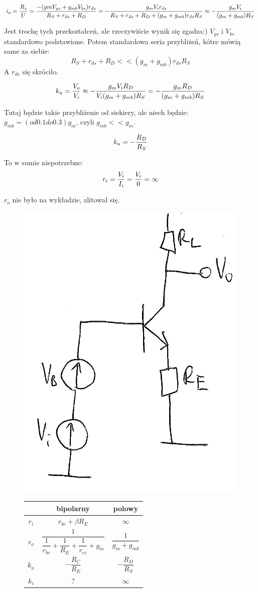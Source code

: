 \documentclass[10pt,a4paper]{article}
\begin{document}
\begin{equation}
i_o = {R_z \over U} = { -(gmV_{gs} + g_{mb}V_{bs})r_{ds} \over R_S + r_{ds} + R_D} = -{g_mV_ir_{ds} \over R_S + r_{ds} + R_D + (g_m+g_{mb})r_{ds}R_S} \approx -{g_mV_i \over  (g_m+g_{mb})R_S} 
\end{equation}

Jest trochę tych przekształceń, ale rzeczywiście wynik się zgadza:) $V_{gs}$ i $V_{bs}$ standardowo podstawione. Potem standardowa seria przybliżeń, kótre mówią same za siebie: 
\begin{equation}
 R_S + r_{ds} + R_D << (g_m+g_{mb})r_{ds}R_S
\end{equation}
A $r_{ds}$ się skróciło.

\begin{equation}
k_u = {V_o \over V_i} \approx -{g_mV_iR_D \over  V_i(g_m+g_{mb})R_S} = -{g_mR_D \over  (g_m+g_{mb})R_S}
\end{equation}

Tutaj będzie takie przybliżenie od siekiery, ale niech będzie: $g_{mb} = (od 0.1 do 0.3) g_m$, czyli $g_{mb} << g_m$.

\begin{equation}
k_u =-{ R_D \over R_S}
\end{equation}

To w sumie niepotrzebne:
\begin{equation}
r_i = {V_i \over I_i} = {V_i \over 0} = \infty
\end{equation}

$r_o$ nie było na wykładzie, zlitował się.


\begin{figure}[H]
\centering
\includegraphics[height=0.3\textwidth]{WDE.png}
\begin{tabular}{c|c|c}
& bipolarny & polowy\\
\hline
$r_i$ & $r_{be} + \beta R_E$ & $\infty$ \\ 

$r_o$ & $\dfrac{1}{\dfrac{1}{r_{be}}+\dfrac{1}{R_E}+\dfrac{1}{r_{ec}}+g_m}$ & $\dfrac{1}{g_m + g_{mb}}$ \\ 

$k_u$ & $-\dfrac{R_C}{R_E}$ & $-\dfrac{R_D}{R_S}$ \\ 

$k_i$ & $?$ & $\infty$ \\ 

\end{tabular} 
\end{figure}
\end{document}
